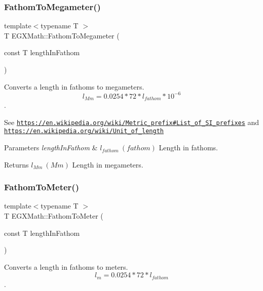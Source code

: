 \subsubsection{\texorpdfstring{Fathom\+To\+Megameter()}{FathomToMegameter()}}
{\footnotesize\ttfamily template$<$typename T $>$ \\
T E\+G\+X\+Math\+::\+Fathom\+To\+Megameter (\begin{DoxyParamCaption}\item[{const T}]{length\+In\+Fathom }\end{DoxyParamCaption})}



Converts a length in fathoms to megameters. \[ l_{Mm}=0.0254 * 72 * l_{fathom} * 10^{-6} \]. 

See \href{https://en.wikipedia.org/wiki/Metric_prefix#List_of_SI_prefixes}{\tt https\+://en.\+wikipedia.\+org/wiki/\+Metric\+\_\+prefix\#\+List\+\_\+of\+\_\+\+S\+I\+\_\+prefixes} and \href{https://en.wikipedia.org/wiki/Unit_of_length}{\tt https\+://en.\+wikipedia.\+org/wiki/\+Unit\+\_\+of\+\_\+length} 
\begin{DoxyParams}{Parameters}
{\em length\+In\+Fathom} & $ l_{fathom}\ (fathom)$ Length in fathoms. \\
\hline
\end{DoxyParams}
\begin{DoxyReturn}{Returns}
$ l_{Mm}\ (Mm)$ Length in megameters. 
\end{DoxyReturn}
\mbox{\label{group___e_g_x_math-_conversions-_length_conversions-_imperial-_fathom-_s_i_ga10d9caaa366193cb8c3b086cfc47a56d}} 
\subsubsection{\texorpdfstring{Fathom\+To\+Meter()}{FathomToMeter()}}
{\footnotesize\ttfamily template$<$typename T $>$ \\
T E\+G\+X\+Math\+::\+Fathom\+To\+Meter (\begin{DoxyParamCaption}\item[{const T}]{length\+In\+Fathom }\end{DoxyParamCaption})}



Converts a length in fathoms to meters. \[ l_{m}=0.0254 * 72 * l_{fathom} \]. 


